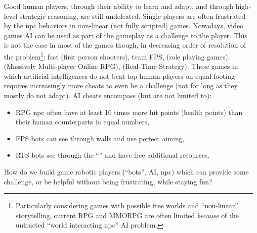 Good human players, through their ability to learn and adapt, and through high-level strategic reasoning, are still undefeated. Single players are often frustrated by the \gls{npc} behaviors in non-linear (not fully scripted) games. Nowadays, video games AI can be used as part of the gameplay as a challenge to the player. 
This is not the case in most of the games though, in decreasing order of resolution of the problem\footnote{Particularly considering games with possible free worlds and ``non-linear'' storytelling, current RPG and MMORPG are often limited \textit{because} of the untracted ``world interacting \gls{npc}'' AI problem.}: fast  (first person shooters), team FPS,  (role playing games),  (Massively Multi-player Online RPG),  (Real-Time Strategy). These games in which artificial intelligences do not beat top human players on equal footing requires increasingly more cheats to even be a challenge (not for long as they mostly do not adapt). AI cheats encompass (but are not limited to):
\begin{itemize}
\item RPG \gls{npc} often have at least 10 times more hit points (health points) than their human counterparts in equal numbers,
\item FPS bots can see through walls and use perfect aiming,
\item RTS bots see through the ``'' and have free additional resources.
\end{itemize}
How do we build game robotic players (``bots'', AI, \gls{npc}) which can provide some challenge, or be helpful without being frustrating, while staying fun?


